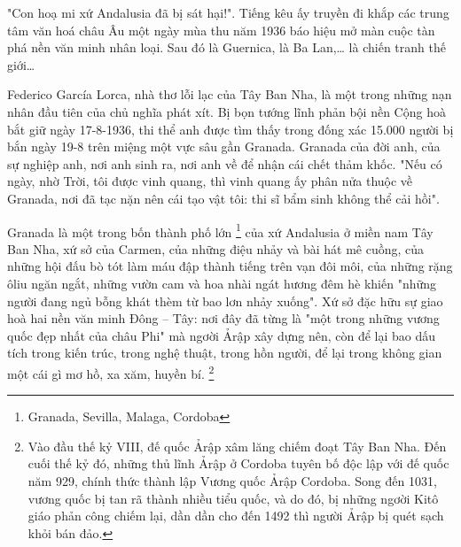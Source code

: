 \documentclass[../main.tex]{subfiles}
\begin{document}
\begin{multicols}{2}

"Con hoạ mi xứ Andalusia đã bị sát hại!". Tiếng kêu ấy truyền đi khắp các trung tâm văn hoá châu Âu một ngày mùa thu năm 1936 báo hiệu mở màn cuộc tàn phá nền văn minh nhân loại. Sau đó là Guernica, là Ba Lan,… là chiến tranh thế giới… 
 
Federico García Lorca, nhà thơ lỗi lạc của Tây Ban Nha, là một trong những nạn nhân đầu tiên của chủ nghĩa phát xít. Bị bọn tướng lĩnh phản bội nền Cộng hoà bắt giữ ngày 17-8-1936, thi thể anh được tìm thấy trong đống xác 15.000 người bị bắn ngày 19-8 trên miệng một vực sâu gần Granada. Granada của đời anh, của sự nghiệp anh, nơi anh sinh ra, nơi anh về để nhận cái chết thảm khốc. "Nếu có ngày, nhờ Trời, tôi được vinh quang, thì vinh quang ấy phân nửa thuộc về Granada, nơi đã tạc nặn nên cái tạo vật tôi: thi sĩ bẩm sinh không thể cải hồi". 
 
Granada là một trong bốn thành phố lớn \footnote{
Granada, Sevilla, Malaga, Cordoba}  của xứ Andalusia ở miền nam Tây Ban Nha, xứ sở của Carmen, của những điệu nhảy và bài hát mê cuồng, của những hội đấu bò tót làm máu đập thành tiếng trên vạn đôi môi, của những rặng ôliu ngăn ngắt, những vườn cam và hoa nhài ngát hương đêm hè khiến "những người đang ngủ bỗng khát thèm từ bao lơn nhảy xuống". Xứ sở đặc hữu sự giao hoà hai nền văn minh Đông – Tây: nơi đây đã từng là "một trong những vương quốc đẹp nhất của châu Phi" mà ngơời Ảrập xây dựng nên, còn để lại bao dấu tích trong kiến trúc, trong nghệ thuật, trong hồn người, để lại trong không gian một cái gì mơ hồ, xa xăm, huyền bí. \footnote{
Vào đầu thế kỷ VIII, đế quốc Ảrập xâm lăng chiếm đoạt Tây Ban Nha. Đến cuối thế kỷ đó, những thủ lĩnh Ảrập ở Cordoba tuyên bố độc lập với đế quốc năm 929, chính thức thành lập Vương quốc Ảrập Cordoba. Song đến 1031, vương quốc bị tan rã thành nhiều tiểu quốc, và do đó, bị những ngơời Kitô giáo phản công chiếm lại, dần dần cho đến 1492 thì người Ảrập bị quét sạch khỏi bán đảo.}  
 

\end{multicols}
\end{document}
